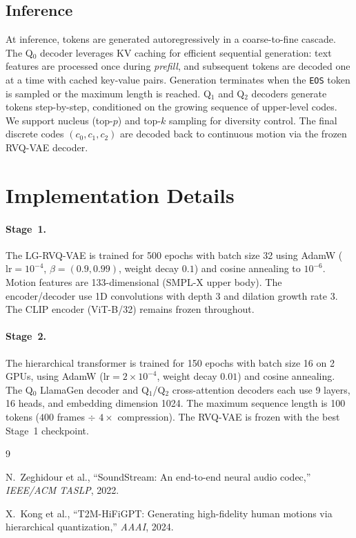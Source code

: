 \documentclass[10pt,twocolumn]{article}
\begin{document}
\subsection{Inference}

At inference, tokens are generated autoregressively in a coarse-to-fine cascade. The Q$_0$ decoder leverages KV caching for efficient sequential generation: text features are processed once during \emph{prefill}, and subsequent tokens are decoded one at a time with cached key-value pairs. Generation terminates when the \texttt{EOS} token is sampled or the maximum length is reached. Q$_1$ and Q$_2$ decoders generate tokens step-by-step, conditioned on the growing sequence of upper-level codes. We support nucleus (top-$p$) and top-$k$ sampling for diversity control. The final discrete codes $(c_0, c_1, c_2)$ are decoded back to continuous motion via the frozen RVQ-VAE decoder.

\section{Implementation Details}

\paragraph{Stage~1.} The LG-RVQ-VAE is trained for 500 epochs with batch size 32 using AdamW ($\text{lr}{=}10^{-4}$, $\beta{=}(0.9, 0.99)$, weight decay $0.1$) and cosine annealing to $10^{-6}$. Motion features are 133-dimensional (SMPL-X upper body). The encoder/decoder use 1D convolutions with depth 3 and dilation growth rate 3. The CLIP encoder (ViT-B/32) remains frozen throughout.

\paragraph{Stage~2.} The hierarchical transformer is trained for 150 epochs with batch size 16 on 2 GPUs, using AdamW ($\text{lr}{=}2{\times}10^{-4}$, weight decay $0.01$) and cosine annealing. The Q$_0$ LlamaGen decoder and Q$_1$/Q$_2$ cross-attention decoders each use 9 layers, 16 heads, and embedding dimension 1024. The maximum sequence length is 100 tokens ($400$ frames $\div$ $4{\times}$ compression). The RVQ-VAE is frozen with the best Stage~1 checkpoint.


\begin{thebibliography}{9}

N.~Zeghidour et al., ``SoundStream: An end-to-end neural audio codec,'' \emph{IEEE/ACM TASLP}, 2022.

X.~Kong et al., ``T2M-HiFiGPT: Generating high-fidelity human motions via hierarchical quantization,'' \emph{AAAI}, 2024.

\end{thebibliography}
\end{document}
